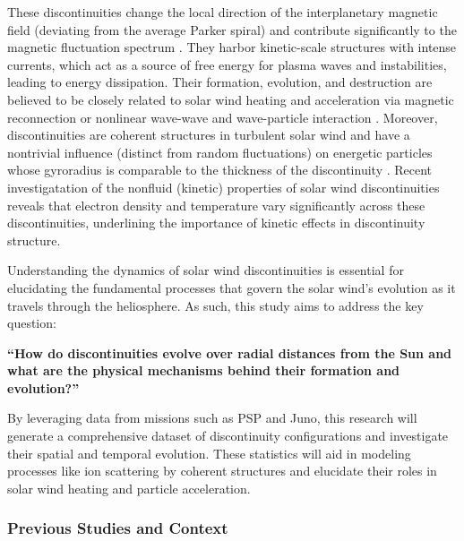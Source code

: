\documentclass[
  letterpaper,
  DIV=11,
  numbers=noendperiod]{scrartcl}
\begin{document}
These discontinuities change the local direction of the interplanetary magnetic field (deviating from the average Parker spiral) and contribute significantly to the magnetic fluctuation spectrum \citep{borovskyContributionStrongDiscontinuities2010}. They harbor kinetic-scale structures with intense currents, which act as a source of free energy for plasma waves and instabilities, leading to energy dissipation\citep{dmitrukTestParticleEnergization2004, macbrideTurbulentCascadeAU2008, osmanIntermittencyLocalHeating2012, tesseinAssociationSuprathermalParticles2013}. Their formation, evolution, and destruction are believed to be closely related to solar wind heating and acceleration via magnetic reconnection \citep{dmitrukTestParticleEnergization2004} or nonlinear wave-wave and wave-particle interaction \citep{medvedevDissipativeDynamicsCollisionless1997}. Moreover, discontinuities are coherent structures in turbulent solar wind and have a nontrivial influence (distinct from random fluctuations) on energetic particles whose gyroradius is comparable to the thickness of the discontinuity \citep{malaraChargedparticleChaoticDynamics2021}. Recent investigatation of the nonfluid (kinetic) properties of solar wind discontinuities \citep{artemyevKineticNatureSolar2019} reveals that electron density and temperature vary significantly across these discontinuities, underlining the importance of kinetic effects in discontinuity structure.

Understanding the dynamics of solar wind discontinuities is essential for elucidating the fundamental processes that govern the solar wind's evolution as it travels through the heliosphere. As such, this study aims to address the key question:

\textbf{``How do discontinuities evolve over radial distances from the Sun and what are the physical mechanisms behind their formation and evolution?''}

By leveraging data from missions such as PSP and Juno, this research will generate a comprehensive dataset of discontinuity configurations and investigate their spatial and temporal evolution. These statistics will aid in modeling processes like ion scattering by coherent structures and elucidate their roles in solar wind heating and particle acceleration.

\subsubsection{Previous Studies and Context}\label{previous-studies-and-context}
\end{document}
